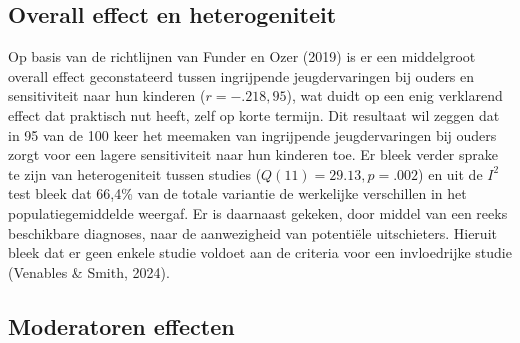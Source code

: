 \documentclass[12pt]{article}
\begin{document}
\subsection{Overall effect en
heterogeniteit}\label{overall-effect-en-heterogeniteit}

Op basis van de richtlijnen van Funder en Ozer (2019) is er een
middelgroot overall effect geconstateerd tussen ingrijpende
jeugdervaringen bij ouders en sensitiviteit naar hun kinderen
(\(r = -.218, 95%
\)), wat duidt op een enig verklarend effect dat praktisch nut heeft,
zelf op korte termijn. Dit resultaat wil zeggen dat in 95 van de 100
keer het meemaken van ingrijpende jeugdervaringen bij ouders zorgt voor
een lagere sensitiviteit naar hun kinderen toe. Er bleek verder sprake
te zijn van heterogeniteit tussen studies (\(Q (11) = 29.13, p = .002\))
en uit de \(I^2\) test bleek dat 66,4\% van de totale variantie de
werkelijke verschillen in het populatiegemiddelde weergaf. Er is
daarnaast gekeken, door middel van een reeks beschikbare diagnoses, naar
de aanwezigheid van potentiële uitschieters. Hieruit bleek dat er geen
enkele studie voldoet aan de criteria voor een invloedrijke studie
(Venables \& Smith, 2024).

\subsection{Moderatoren effecten}\label{moderatoren-effecten}
\end{document}
